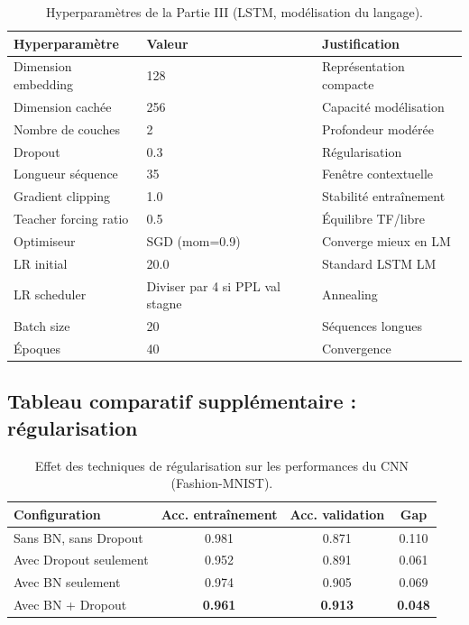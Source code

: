\documentclass[11pt,a4paper]{article}
\begin{document}
\begin{table}[H]
  \centering
  \caption{Hyperparamètres de la Partie III (LSTM, modélisation du langage).}
  \label{tab:hp_lstm}
  \begin{tabular}{lll}
    \toprule
    \textbf{Hyperparamètre} & \textbf{Valeur} & \textbf{Justification} \\
    \midrule
    Dimension embedding     & 128             & Représentation compacte  \\
    Dimension cachée        & 256             & Capacité modélisation    \\
    Nombre de couches       & 2               & Profondeur modérée       \\
    Dropout                 & 0.3             & Régularisation           \\
    Longueur séquence       & 35              & Fenêtre contextuelle     \\
    Gradient clipping       & 1.0             & Stabilité entraînement   \\
    Teacher forcing ratio   & 0.5             & Équilibre TF/libre       \\
    Optimiseur              & SGD (mom=0.9)   & Converge mieux en LM     \\
    LR initial              & 20.0            & Standard LSTM LM         \\
    LR scheduler            & Diviser par 4 si PPL val stagne & Annealing \\
    Batch size              & 20              & Séquences longues        \\
    Époques                 & 40              & Convergence              \\
    \bottomrule
  \end{tabular}
\end{table}

\subsection{Tableau comparatif supplémentaire : régularisation}

\begin{table}[H]
  \centering
  \caption{Effet des techniques de régularisation sur les performances du CNN (Fashion-MNIST).}
  \label{tab:regularization_cnn}
  \begin{tabular}{lccc}
    \toprule
    \textbf{Configuration} & \textbf{Acc. entraînement} & \textbf{Acc. validation} & \textbf{Gap} \\
    \midrule
    Sans BN, sans Dropout   & 0.981 & 0.871 & 0.110 \\
    Avec Dropout seulement  & 0.952 & 0.891 & 0.061 \\
    Avec BN seulement       & 0.974 & 0.905 & 0.069 \\
    Avec BN + Dropout       & \textbf{0.961} & \textbf{0.913} & \textbf{0.048} \\
    \bottomrule
  \end{tabular}
\end{table}
\end{document}
